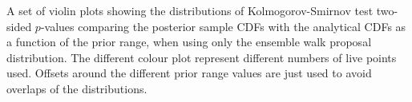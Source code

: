 \label{fig:walkpropks}
A set of violin plots showing the distributions of Kolmogorov-Smirnov test
two-sided $p$-values comparing the posterior sample CDFs with the analytical
CDFs as a function of the prior range, when using only the ensemble walk proposal distribution. The different colour plot represent different numbers of live points used.
Offsets around the different prior range values are just used to avoid overlaps of the
distributions.
